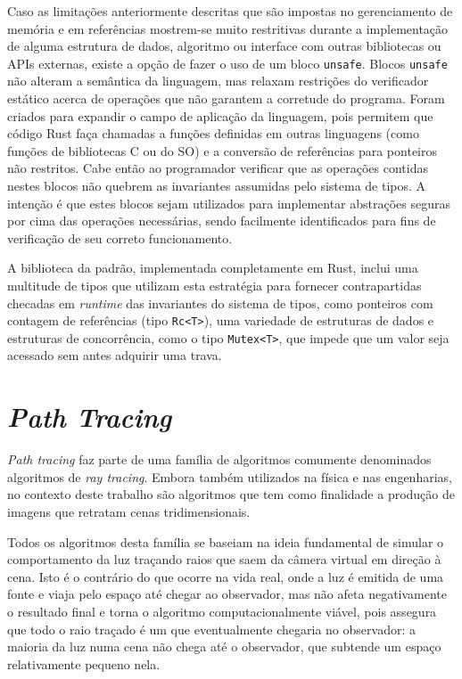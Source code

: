 \documentclass[tg]{mdtufsm}
\begin{document}
Caso as limitações anteriormente descritas que são impostas no gerenciamento de memória e em referências mostrem-se muito restritivas durante a implementação de alguma estrutura de dados, algoritmo ou interface com outras bibliotecas ou APIs externas, existe a opção de fazer o uso de um bloco \texttt{unsafe}. Blocos \texttt{unsafe} não alteram a semântica da linguagem, mas relaxam restrições do verificador estático acerca de operações que não garantem a corretude do programa. Foram criados para expandir o campo de aplicação da linguagem, pois permitem que código Rust faça chamadas a funções definidas em outras linguagens (como funções de bibliotecas C ou do SO) e a conversão de referências para ponteiros não restritos. Cabe então ao programador verificar que as operações contidas nestes blocos não quebrem as invariantes assumidas pelo sistema de tipos. A intenção é que estes blocos sejam utilizados para implementar abstrações seguras por cima das operações necessárias, sendo facilmente identificados para fins de verificação de seu correto funcionamento. \citep{rust-unsafe}

A biblioteca da padrão, implementada completamente em Rust, inclui uma multitude de tipos que utilizam esta estratégia para fornecer contrapartidas checadas em \emph{runtime} das invariantes do sistema de tipos, como ponteiros com contagem de referências (tipo \texttt{Rc<T>}), uma variedade de estruturas de dados e estruturas de concorrência, como o tipo \texttt{Mutex<T>}, que impede que um valor seja acessado sem antes adquirir uma trava.

\section{\emph{Path Tracing}}

\emph{Path tracing} faz parte de uma família de algoritmos comumente denominados algoritmos de
\emph{ray tracing}. Embora também utilizados na física e nas engenharias, no contexto deste trabalho
são algoritmos que tem como finalidade a produção de imagens que retratam cenas tridimensionais.

Todos os algoritmos desta família se baseiam na ideia fundamental de simular o comportamento da luz
traçando raios que saem da câmera virtual em direção à cena. Isto é o contrário do que ocorre na
vida real, onde a luz é emitida de uma fonte e viaja pelo espaço até chegar ao observador, mas não
afeta negativamente o resultado final e torna o algoritmo computacionalmente viável, pois assegura
que todo o raio traçado é um que eventualmente chegaria no observador: a maioria da luz numa cena
não chega até o observador, que subtende um espaço relativamente pequeno nela. \citep{pharr2010}
\end{document}
